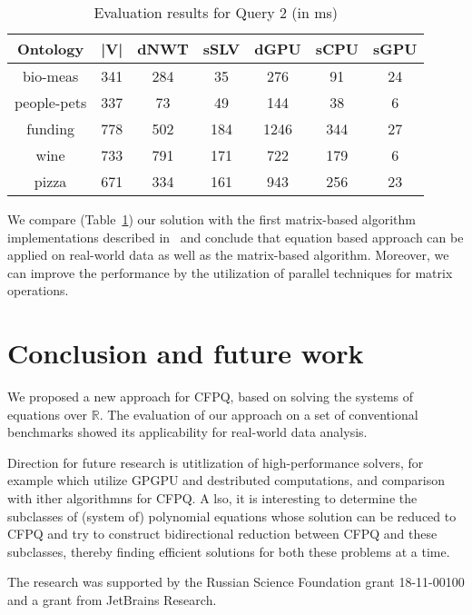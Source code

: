 \documentclass[sigconf]{acmart}
\begin{document}
\begin{table}[h]
\centering
\caption{Evaluation results for Query 2 (in ms)}
\label{tbl2}
\begin{tabular}{ | c | c || c | c || c | c | c |}
\hline
Ontology    & |V| & dNWT & sSLV & dGPU & sCPU &  sGPU \\
\hline                           
\hline                           
bio-meas    & 341 &  284 & 35   & 276  & 91  & 24\\
people-pets & 337 &  73  & 49   & 144  & 38  & 6\\
funding     & 778 &  502 & 184  & 1246 & 344 & 27\\
wine        & 733 &  791 & 171  & 722  & 179 & 6\\
pizza       & 671 &  334 & 161  & 943  & 256 & 23\\
\hline
\end{tabular}

\end{table}

We compare (Table~\ref{tbl2}) our solution with the first matrix-based algorithm implementations described in~\cite{azimov2018context} and conclude that equation based approach can be applied on real-world data as well as the matrix-based algorithm. 
Moreover, we can improve the performance by the utilization of parallel techniques for matrix operations.

\section{Conclusion and future work}

We proposed a new approach for CFPQ, based on solving the systems of equations over $\mathbb{R}$.
The evaluation of our approach on a set of conventional benchmarks showed its applicability for real-world data analysis.

Direction for future research is utitlization of high-performance solvers, for example which utilize GPGPU and destributed computations, and comparison with ither algorithmns for CFPQ.
A   lso, it is interesting to determine the subclasses of (system of) polynomial equations whose solution can be reduced to CFPQ and try to construct bidirectional reduction between CFPQ and these subclasses, thereby finding efficient solutions for both these problems at a time.



\begin{acks}
The research was supported by the Russian Science Foundation grant 18-11-00100 and a grant from JetBrains Research.
\end{acks}




\end{document}
